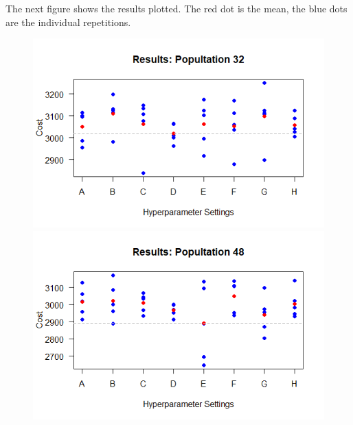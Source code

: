 The next figure shows the results plotted. The red dot is the mean, the blue dots are the individual repetitions.
\begin{figure}[H] 
	\begin{minipage}[b]{0.5\linewidth}
		\centering
		\includegraphics[width=1\linewidth]{simulations/population/plots/32} 
	\end{minipage}%
	\begin{minipage}[b]{0.5\linewidth}
		\centering
		\includegraphics[width=1\linewidth]{simulations/population/plots/48} 
	\end{minipage}
	

\end{figure}
